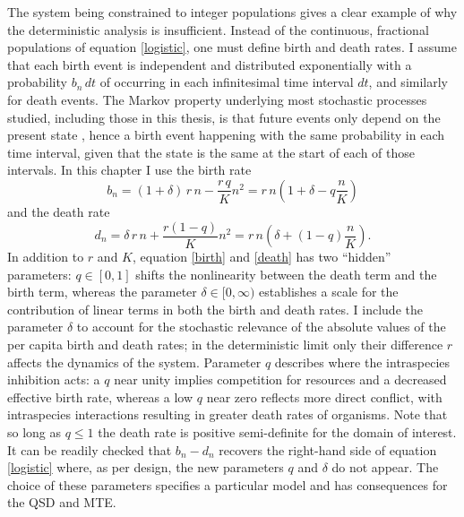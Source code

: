 The system being constrained to integer populations gives a clear example of why the deterministic analysis is insufficient. 
Instead of the continuous, fractional populations of equation \ref{logistic}, one must define birth and death rates. 
I assume that each birth event is independent and distributed exponentially with a probability $b_n\,dt$ of occurring in each infinitesimal time interval $dt$, and similarly for death events. 
The Markov property underlying most stochastic processes studied, including those in this thesis, is that future events only depend on the present state \cite{Nisbet1982,Gardiner2004a,VanKampen1992}, hence a birth event happening with the same probability in each time interval, given that the state is the same at the start of each of those intervals. 
In this chapter I use the birth rate
\begin{equation}
b_n = (1 + \delta)\,r\,n - \frac{r\,q}{K}n^2 = r\,n\left(1+\delta-q\frac{n}{K}\right)
\label{birth}
\end{equation}
and the death rate
\begin{equation}
d_n = \delta\,r\,n + \frac{r(1-q)}{K} n^2 = r\,n\left(\delta+(1-q)\frac{n}{K}\right).
\label{death}
\end{equation}
In addition to $r$ and $K$, equation \ref{birth} and \ref{death} has two ``hidden'' parameters: $q\in[0,1]$ shifts the nonlinearity between the death term and the birth term, whereas the parameter $\delta\in[0,\infty)$ establishes a scale for the contribution of linear terms in both the birth and death rates. 
I include the parameter $\delta$ to account for the stochastic relevance of the absolute values of the per capita birth and death rates; in the deterministic limit only their difference $r$ affects the dynamics of the system. 
Parameter $q$ describes where the intraspecies inhibition acts: a $q$ near unity implies competition for resources and a decreased effective birth rate, whereas a low $q$ near zero reflects more direct conflict, with intraspecies interactions resulting in greater death rates of organisms. 
Note that so long as $q\leq 1$ the death rate is positive semi-definite for the domain of interest. 
It can be readily checked that $b_n-d_n$ recovers the right-hand side of equation \ref{logistic} where, as per design, the new parameters $q$ and $\delta$ do not appear.
The choice of these parameters specifies a particular model and has consequences for the QSD and MTE. 

